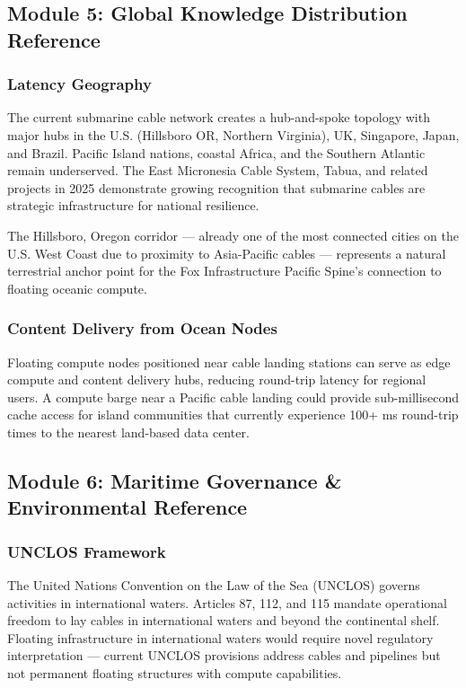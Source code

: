 \documentclass[11pt,letterpaper]{article}
\begin{document}
\subsection{Module 5: Global Knowledge Distribution Reference}

\subsubsection{Latency Geography}

The current submarine cable network creates a hub-and-spoke topology with major hubs in the U.S. (Hillsboro OR, Northern Virginia), UK, Singapore, Japan, and Brazil. Pacific Island nations, coastal Africa, and the Southern Atlantic remain underserved. The East Micronesia Cable System, Tabua, and related projects in 2025 demonstrate growing recognition that submarine cables are strategic infrastructure for national resilience.

The Hillsboro, Oregon corridor --- already one of the most connected cities on the U.S. West Coast due to proximity to Asia-Pacific cables --- represents a natural terrestrial anchor point for the Fox Infrastructure Pacific Spine's connection to floating oceanic compute.

\subsubsection{Content Delivery from Ocean Nodes}

Floating compute nodes positioned near cable landing stations can serve as edge compute and content delivery hubs, reducing round-trip latency for regional users. A compute barge near a Pacific cable landing could provide sub-millisecond cache access for island communities that currently experience 100+ ms round-trip times to the nearest land-based data center.

\subsection{Module 6: Maritime Governance \& Environmental Reference}

\subsubsection{UNCLOS Framework}

The United Nations Convention on the Law of the Sea (UNCLOS) governs activities in international waters. Articles 87, 112, and 115 mandate operational freedom to lay cables in international waters and beyond the continental shelf. Floating infrastructure in international waters would require novel regulatory interpretation --- current UNCLOS provisions address cables and pipelines but not permanent floating structures with compute capabilities.
\end{document}
